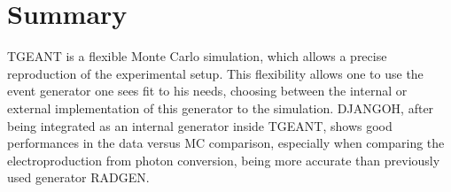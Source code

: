 
\section{Summary}

TGEANT is a flexible Monte Carlo simulation, which allows a precise reproduction of the experimental setup. This flexibility allows one to use the event generator one sees fit to his needs, choosing between the internal or external implementation of this generator to the simulation. DJANGOH, after being integrated as an internal generator inside TGEANT, shows good performances in the data versus MC comparison, especially when comparing the electroproduction from photon conversion, being more accurate than previously used generator RADGEN.

